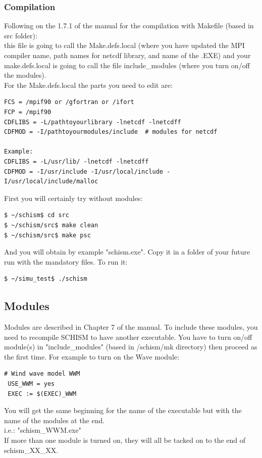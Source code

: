 \documentclass[preprints,briefreport,accept,oneauthor,pdftex]{Definitions/mdpi}
\begin{document}
\subsubsection{Compilation}
\noindent Following on the 1.7.1 of the manual for the compilation with Makefile (based in src folder):\\
this file is going to call the Make.defs.local (where you have updated the MPI compiler name, path names for netcdf library, and name of the .EXE) and your make.defs.local is going to call the file include\_modules (where you turn on/off the modules). \\
For the Make.defs.local the parts you need to edit are:
\begin{lstlisting}
FCS = /mpif90 or /gfortran or /ifort
FCP = /mpif90
CDFLIBS = -L/pathtoyourlibrary -lnetcdf -lnetcdff
CDFMOD = -I/pathtoyourmodules/include  # modules for netcdf

Example:
CDFLIBS = -L/usr/lib/ -lnetcdf -lnetcdff
CDFMOD = -I/usr/include -I/usr/local/include -I/usr/local/include/malloc 
\end{lstlisting}
First you will certainly try without modules:
\begin{lstlisting}
$ ~/schism$ cd src 
$ ~/schism/src$ make clean
$ ~/schism/src$ make psc
\end{lstlisting}
And you will obtain by example "schism.exe". Copy it in a folder of your future run with the mandatory files. To run it:
\begin{lstlisting}
$ ~/simu_test$ ./schism
\end{lstlisting}
\subsection{Modules}
\noindent Modules are described in Chapter 7 of the manual. To include these modules, you need to recompile SCHISM to have another executable. You have to turn on/off module(s) in "include\_modules" (based in /schism/mk directory) then proceed as the first time. For example to turn on the Wave module:
\begin{lstlisting}
# Wind wave model WWM
 USE_WWM = yes
 EXEC := $(EXEC)_WWM
\end{lstlisting}
You will get the same beginning for the name of the executable but with the name of the modules at the end. \\
i.e.: "schism\_WWM.exe"\\
If more than one module is turned on, they will all be tacked on to the end of schism\_XX\_XX.
\end{document}
